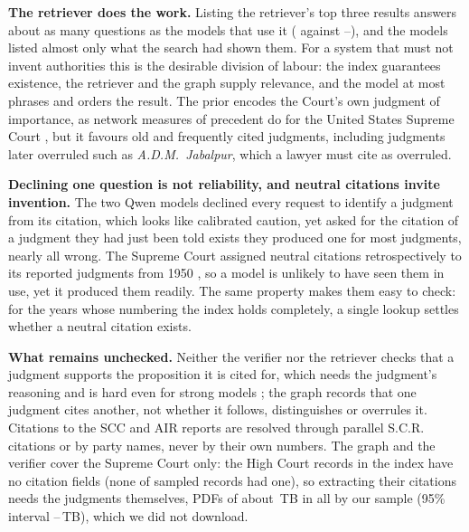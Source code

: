 \documentclass[conference]{IEEEtran}
\begin{document}
\textbf{The retriever does the work.} Listing the retriever's top three results answers about as many questions as the models that use it (\QHybridPriorHitThree{} against \RefTopicPriorGemma--\RefTopicPriorLlama), and the models listed almost only what the search had shown them. For a system that must not invent authorities this is the desirable division of labour: the index guarantees existence, the retriever and the graph supply relevance, and the model at most phrases and orders the result. The prior encodes the Court's own judgment of importance, as network measures of precedent do for the United States Supreme Court \cite{fowler2007}, but it favours old and frequently cited judgments, including judgments later overruled such as \emph{A.D.M.\ Jabalpur}, which a lawyer must cite as overruled.

\textbf{Declining one question is not reliability, and neutral citations invite invention.} The two Qwen models declined every request to identify a judgment from its citation, which looks like calibrated caution, yet asked for the citation of a judgment they had just been told exists they produced one for most judgments, nearly all wrong. The Supreme Court assigned neutral citations retrospectively to its reported judgments from 1950 \cite{scneutral,scneutral2}, so a model is unlikely to have seen them in use, yet it produced them readily. The same property makes them easy to check: for the \INSCCompleteCount{} years whose numbering the index holds completely, a single lookup settles whether a neutral citation exists.

\textbf{What remains unchecked.} Neither the verifier nor the retriever checks that a judgment supports the proposition it is cited for, which needs the judgment's reasoning and is hard even for strong models \cite{verma2026}; the graph records that one judgment cites another, not whether it follows, distinguishes or overrules it. Citations to the SCC and AIR reports are resolved through parallel S.C.R. citations or by party names, never by their own numbers. The graph and the verifier cover the Supreme Court only: the High Court records in the index have no citation fields (none of \HCMetaN{} sampled records had one), so extracting their citations needs the judgments themselves, \HCRecords{} PDFs of about \HCTotalTB\,TB in all by our sample (95\% interval \HCTotalTBLow--\HCTotalTBHigh\,TB), which we did not download.
\end{document}

